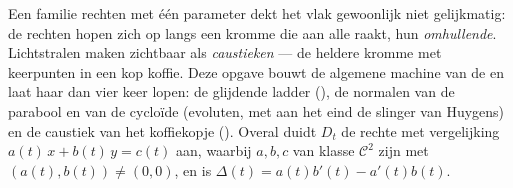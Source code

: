 \begin{problem}\label{pb:b2:curves:1}
Een familie rechten met één parameter dekt het vlak gewoonlijk niet
gelijkmatig: de rechten hopen zich op langs een kromme die aan alle
raakt, hun \emph{omhullende}. Lichtstralen maken
 zichtbaar als \emph{caustieken} --- de heldere kromme
met keerpunten in een kop koffie. Deze opgave bouwt de algemene
machine van de  en laat haar dan vier keer lopen: de
glijdende ladder (), de normalen van de parabool en van de
cycloïde (evoluten, met aan het eind de slinger van Huygens) en de
caustiek van het koffiekopje (). Overal duidt $D_t$ de
rechte met vergelijking $a(t)\,x + b(t)\,y = c(t)$ aan, waarbij $a,
b, c$ van klasse $\mathcal C^2$ zijn met $(a(t), b(t)) \neq (0,0)$,
en is $\Delta(t) = a(t)b'(t) - a'(t)b(t)$.


\end{problem}
